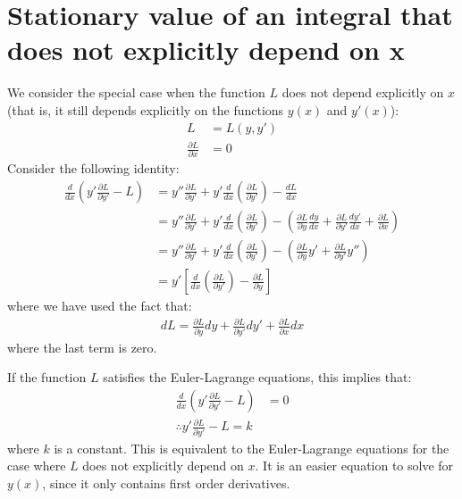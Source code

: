\section{Stationary value of an integral that does not explicitly depend on x}
We consider the special case when the function $L$ does not depend explicitly on $x$ (that is, it still depends explicitly on the functions $y(x)$ and $y'(x)$):
\begin{align}
L&=L(y,y')\nonumber\\
\frac{\partial L}{\partial x}&=0
\end{align}
Consider the following identity:
\begin{align}
\frac{d}{dx}\left(y'\frac{\partial L}{\partial y'} -L \right)&=y''\frac{\partial L}{\partial y'}+y' \frac{d}{dx}\left(\frac{\partial L}{\partial y'}\right)- \frac{dL}{dx}\nonumber\\
&=y''\frac{\partial L}{\partial y'}+y' \frac{d}{dx}\left(\frac{\partial L}{\partial y'}\right)-\left(\frac{\partial L}{\partial y}\frac{dy}{dx}+\frac{\partial L}{\partial y'}\frac{dy'}{dx} +\frac{\partial L}{\partial x} \right)\nonumber\\
&=y''\frac{\partial L}{\partial y'}+y' \frac{d}{dx}\left(\frac{\partial L}{\partial y'}\right)-\left(\frac{\partial L}{\partial y}y'+\frac{\partial L}{\partial y'}y''  \right)\nonumber\\
&=y'\left[ \frac{d}{dx}\left(\frac{\partial L}{\partial y'}\right)-\frac{\partial L}{\partial y}\right]
\end{align}
where we have used the fact that:
\begin{align}
dL=\frac{\partial L}{\partial y}dy+\frac{\partial L}{\partial y'}dy' +\frac{\partial L}{\partial x}dx 
\end{align}
where the last term is zero.

If the function $L$ satisfies the Euler-Lagrange equations, this implies that:
\begin{align}
\frac{d}{dx}\left(y'\frac{\partial L}{\partial y'} -L \right)&=0\nonumber\\
\therefore y'\frac{\partial L}{\partial y'} -L =k
\label{eqn:varnox}
\end{align}
where $k$ is a constant. This is equivalent to the Euler-Lagrange equations for the case where $L$ does not explicitly depend on $x$. It is an easier equation to solve for $y(x)$, since it only contains first order derivatives. 

